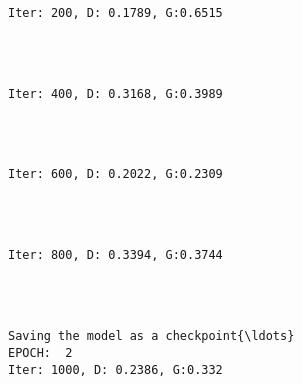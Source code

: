\documentclass[11pt]{article}
\begin{document}
    \begin{Verbatim}[commandchars=\\\{\}]

Iter: 200, D: 0.1789, G:0.6515
    \end{Verbatim}

    \begin{center}
    \end{center}
    { \hspace*{\fill} \\}
    
    \begin{Verbatim}[commandchars=\\\{\}]

Iter: 400, D: 0.3168, G:0.3989
    \end{Verbatim}

    \begin{center}
    \end{center}
    { \hspace*{\fill} \\}
    
    \begin{Verbatim}[commandchars=\\\{\}]

Iter: 600, D: 0.2022, G:0.2309
    \end{Verbatim}

    \begin{center}
    \end{center}
    { \hspace*{\fill} \\}
    
    \begin{Verbatim}[commandchars=\\\{\}]

Iter: 800, D: 0.3394, G:0.3744
    \end{Verbatim}

    \begin{center}
    \end{center}
    { \hspace*{\fill} \\}
    
    \begin{Verbatim}[commandchars=\\\{\}]

Saving the model as a checkpoint{\ldots}
EPOCH:  2
Iter: 1000, D: 0.2386, G:0.332
    \end{Verbatim}
\end{document}

